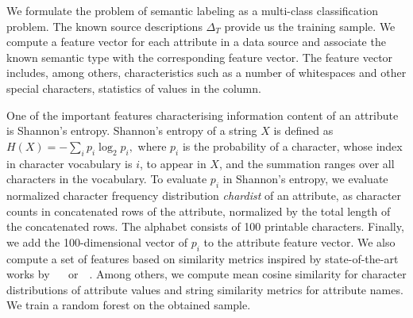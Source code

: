 \documentclass[letterpaper]{article} %
\newcommand{\authornote}[3]{
  {\fbox{\sc 
  #1}:$\blacktriangleright$\textcolor{#2}{\small{#3}}$\blacktriangleleft$}%
}
\newcommand{\npr}[1]{\authornote{NPR}{orange}{#1}}
\newcommand{\ignore}[1]{}
\newcommand{\forijcai}[1]{}
\newcommand{\citeasnoun}[1]{\citeauthor{#1}~\shortcite{#1}}
\begin{document}
We formulate the problem of semantic labeling as a multi-class classification
problem.
The known source descriptions $\Delta_T$ provide us the training sample.
We compute a feature vector for each attribute in a data source and associate 
the known semantic type with the corresponding feature vector.
The feature vector includes, among others, characteristics
such as a number 
of whitespaces and other special characters, statistics of 
values in the column. 
\forijcai{A full list can be found in Appendix \ref{Ann:SemLab}.}
One of the important features characterising information content of an attribute is Shannon's entropy.
Shannon's entropy 
 of a string $X$ is defined as
$H(X) = -\sum_{i}{p_i \log_{2}p_i},$ where $p_i$ is the probability of a character, whose index in character vocabulary is $i$, to appear in $X$, and the summation ranges over all
characters in the vocabulary.
To evaluate $p_i$ in Shannon's entropy, we evaluate normalized character frequency distribution \emph{chardist} of an attribute, as character counts in concatenated rows of the attribute, normalized by the total length of the concatenated rows.
The alphabet\forijcai{vocabulary of all characters} consists of 100 printable characters\forijcai{ (including $\backslash$n)}.
Finally, we add the 100-dimensional vector of $p_i$ to the attribute feature vector.
We also compute a set of features based on similarity metrics inspired by state-of-the-art works by ~\citeasnoun{Pham:semantic} or~\citeasnoun{Ritze:matching}.
Among others, we compute mean cosine similarity for character distributions of attribute values and string similarity metrics for attribute names.
We train a random forest on the obtained sample. 
\end{document}
